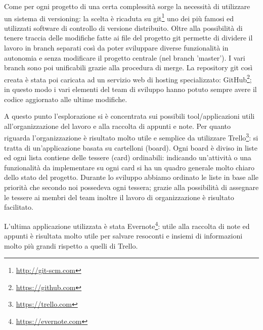 \documentclass[12pt]{report}
\begin{document}
Come per ogni progetto di una certa complessità sorge la necessità di utilizzare un sistema di versioning: la scelta è ricaduta su git\footnote{\url{http://git-scm.com}} uno dei più famosi ed utilizzati software di controllo di versione distribuito. Oltre alla possibilità di tenere traccia delle modifiche fatte ai file del progetto git permette di dividere il lavoro in branch separati così da poter sviluppare diverse funzionalità in autonomia e senza modificare il progetto centrale (nel branch 'master'). I vari branch sono poi unificabili grazie alla procedura di merge. La repository git così creata è stata poi caricata ad un servizio web di hosting specializzato: GitHub\footnote{\url{https://github.com}}; in questo modo i vari elementi del team di sviluppo hanno potuto sempre avere il codice aggiornato alle ultime modifiche.

\vspace{5mm} %

A questo punto l'esplorazione si è concentrata sui possibili tool/applicazioni utili all'organizzazione del lavoro e alla raccolta di appunti e note.
Per quanto riguarda l'organizzazione è risultato molto utile e semplice da utilizzare Trello\footnote{\url{https://trello.com}}: si tratta di un'applicazione basata su cartelloni (board). Ogni board è diviso in liste ed ogni lista contiene delle tessere (card) ordinabili: indicando un'attività o una funzionalità da implementare su ogni card si ha un quadro generale molto chiaro dello stato del progetto. Durante lo sviluppo abbiamo ordinato le liste in base alle priorità che secondo noi possedeva ogni tessera; grazie alla possibilità di assegnare le tessere ai membri del team inoltre il lavoro di organizzazione è risultato facilitato.

L'ultima applicazione utilizzata è stata Evernote\footnote{\url{https://evernote.com}}: utile alla raccolta di note ed appunti è risultata molto utile per salvare resoconti e insiemi di informazioni molto più grandi rispetto a quelli di Trello. 

\vspace{5mm} %
\end{document}
